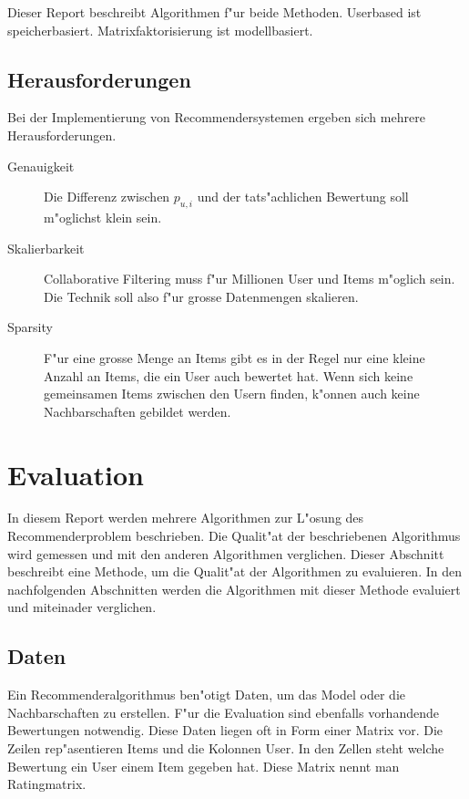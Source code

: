 \documentclass[a4paper, 12pt]{article}
\begin{document}
Dieser Report beschreibt Algorithmen f"ur beide Methoden. Userbased ist speicherbasiert. Matrixfaktorisierung ist modellbasiert.

\subsection{Herausforderungen}
\label{sec:challenges}

Bei der Implementierung von Recommendersystemen ergeben sich mehrere Herausforderungen.

\begin{description}
\item[Genauigkeit]  Die Differenz zwischen $p_{u,i}$ und der tats"achlichen Bewertung soll m"oglichst klein sein.
\item[Skalierbarkeit] 
Collaborative Filtering muss f"ur Millionen User und Items m"oglich sein. Die Technik soll also f"ur grosse Datenmengen skalieren.
\item[Sparsity] F"ur eine grosse Menge an Items gibt es in der Regel nur eine kleine Anzahl an Items, die ein User auch bewertet hat. Wenn sich keine gemeinsamen Items zwischen den Usern finden, k"onnen auch keine Nachbarschaften gebildet werden.
\end{description}

\section{Evaluation}
\label{sec:evaluation}

In diesem Report werden mehrere Algorithmen zur L"osung des Recommenderproblem beschrieben. Die Qualit"at der beschriebenen Algorithmus wird gemessen und mit den anderen Algorithmen verglichen. Dieser Abschnitt beschreibt eine Methode, um die Qualit"at der Algorithmen zu evaluieren. In den nachfolgenden Abschnitten werden die Algorithmen mit dieser Methode evaluiert und miteinader verglichen.

\subsection{Daten}
\label{sec:data}

Ein Recommenderalgorithmus ben"otigt Daten, um das Model oder die Nachbarschaften zu erstellen. F"ur die Evaluation sind ebenfalls vorhandende Bewertungen notwendig. Diese Daten liegen oft in Form einer Matrix vor. Die Zeilen rep"asentieren Items und die Kolonnen User. In den Zellen steht welche Bewertung ein User einem Item gegeben hat. Diese Matrix nennt man Ratingmatrix.
\end{document}
